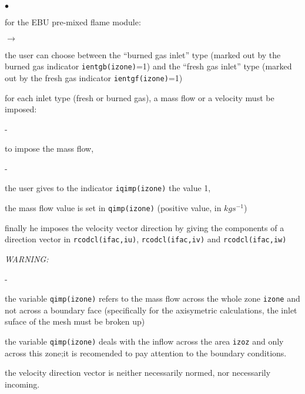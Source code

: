 {{\begin{list}{$\bullet$}{}
       \item for the EBU pre-mixed flame module:
             \begin{list}{$\rightarrow$}{}
                    \item the user can choose between the ``burned gas
                          inlet'' type (marked out by the burned gas indicator
                          \texttt{ientgb(izone)}=1) and the
                          ``fresh gas inlet'' type (marked out by
                          the fresh gas indicator
                          \texttt{ientgf(izone)}=1)
                    \item for each inlet type (fresh or burned
                          gas), a mass flow or a velocity must be imposed:

                          \begin{list}{-}{}
                                 \item to impose the mass flow,
                                     \begin{list}{-}{}
                                       \item the user gives to
                                             the indicator
                                             \texttt{iqimp(izone)}
                                             the value 1,
                                       \item  the
                                             mass flow value is set in
                                             \texttt{qimp(izone)}
                                             (positive value, in $kgs^{-1}$)
                                       \item finally he imposes the
                                             velocity vector direction
                                             by giving the components of
                                             a direction vector in
                                             \texttt{rcodcl(ifac,iu)}, \texttt{rcodcl(ifac,iv)} and \texttt{rcodcl(ifac,iw)}
                                     \end{list}

{\em WARNING:
\begin{list}{-}{}
\item the variable \texttt{qimp(izone)} refers to the mass flow across the whole
      zone \texttt{izone} and not across a boundary face (specifically for the axisymetric calculations, the inlet suface of the mesh must be broken up)
\item the variable \texttt{qimp(izone)} deals with the inflow across the area \texttt{izoz} and only across this zone;it is recomended to pay attention to the boundary conditions.
\item the velocity direction vector is neither necessarily normed, nor
      necessarily incoming.
\end{list}}


\end{list}
\end{list}
\end{list}}}
